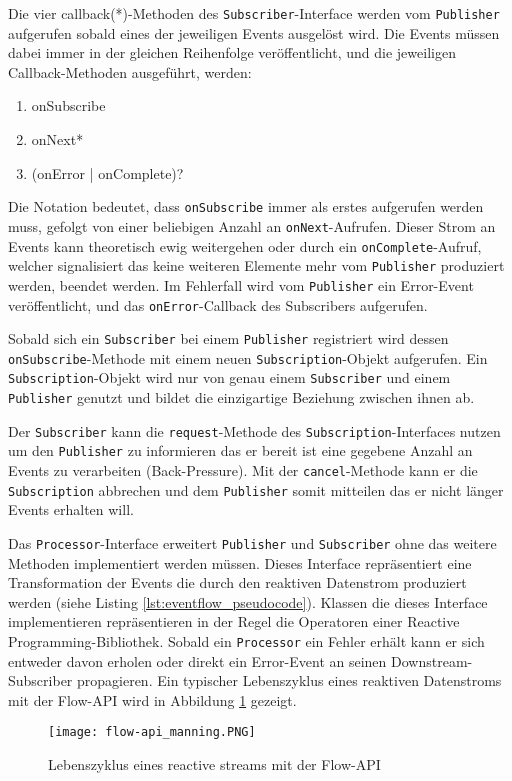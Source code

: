 Die vier \gls{callback}(*)-Methoden des \verb|Subscriber|-Interface werden vom \verb|Publisher| aufgerufen sobald eines der jeweiligen Events ausgelöst wird.
Die Events müssen dabei immer in der gleichen Reihenfolge veröffentlicht, und die jeweiligen Callback-Methoden ausgeführt, werden:
\begin{enumerate}
  \item onSubscribe
  \item onNext*
  \item (onError | onComplete)?
\end{enumerate}
Die Notation bedeutet, dass \verb|onSubscribe| immer als erstes aufgerufen werden muss, gefolgt von einer beliebigen Anzahl an
\verb|onNext|-Aufrufen. Dieser Strom an Events kann theoretisch ewig weitergehen oder durch ein \verb|onComplete|-Aufruf, welcher
signalisiert das keine weiteren Elemente mehr vom \verb|Publisher| produziert werden, beendet werden.
Im Fehlerfall wird vom \verb|Publisher| ein Error-Event veröffentlicht, und das \verb|onError|-Callback des Subscribers aufgerufen.

Sobald sich ein \verb|Subscriber| bei einem \verb|Publisher| registriert wird dessen \verb|onSubscribe|-Methode mit einem neuen
\verb|Subscription|-Objekt aufgerufen. Ein \verb|Subscription|-Objekt wird nur von genau einem \verb|Subscriber| und einem \verb|Publisher| genutzt
und bildet die einzigartige Beziehung zwischen ihnen ab.

Der \verb|Subscriber| kann die \verb|request|-Methode des \verb|Subscription|-Interfaces nutzen um den \verb|Publisher| zu informieren das er bereit
ist eine gegebene Anzahl an Events zu verarbeiten (Back-Pressure). Mit der \verb|cancel|-Methode kann er
die \verb|Subscription| abbrechen und dem \verb|Publisher|
somit mitteilen das er nicht länger Events erhalten will.
\parencite{OracleFlow}

Das \verb|Processor|-Interface erweitert \verb|Publisher| und \verb|Subscriber| ohne das weitere Methoden implementiert werden müssen.
Dieses Interface repräsentiert eine Transformation der Events die durch den
reaktiven Datenstrom produziert werden (siehe Listing \ref{lst:eventflow_pseudocode}).
Klassen die dieses Interface implementieren repräsentieren in der Regel die Operatoren einer Reactive Programming-Bibliothek.
Sobald ein \verb|Processor| ein Fehler erhält kann er sich entweder davon erholen oder direkt ein Error-Event an seinen
Downstream-Subscriber propagieren. Ein typischer Lebenszyklus eines reaktiven Datenstroms mit der Flow-API wird in
Abbildung \ref{fig:flow-api} gezeigt.
\begin{figure}[ht!]
  \centering
  \texttt{[image: flow-api\_manning.PNG]}
  \caption{Lebenszyklus eines reactive streams mit der Flow-API \parencite[Kapitel 17,  Figure 17.3]{JavaInAction}}
  \label{fig:flow-api}
\end{figure}
\newpage

